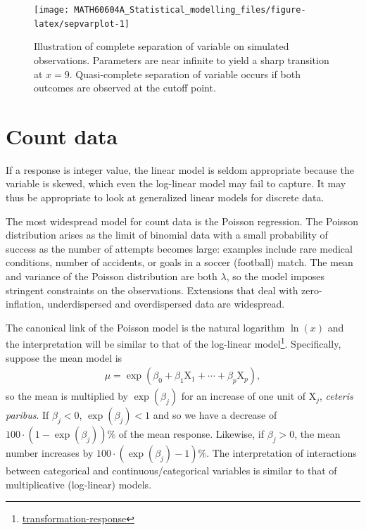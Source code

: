 \documentclass[
  11pt,
  letterpaper,
]{book}
\renewcommand{\href}[2]{#2\footnote{\url{#1}}}
\theoremstyle{definition}
\theoremstyle{definition}
\theoremstyle{definition}
\theoremstyle{definition}
\theoremstyle{remark}
\begin{document}
\begin{figure}

{\centering \texttt{[image: MATH60604A\_Statistical\_modelling\_files/figure-latex/sepvarplot-1]} 

}

\caption{Illustration of complete separation of variable on simulated observations. Parameters are near infinite to yield a sharp transition at $x=9$. Quasi-complete separation of variable occurs if both outcomes are observed at the cutoff point.}\label{fig:sepvarplot}
\end{figure}

\hypertarget{count-data}{%
\section{Count data}\label{count-data}}

If a response is integer value, the linear model is seldom appropriate because the variable is skewed, which even the log-linear model may fail to capture. It may thus be appropriate to look at generalized linear models for discrete data.

The most widespread model for count data is the Poisson regression. The Poisson distribution arises as the limit of binomial data with a small probability of success as the number of attempts becomes large: examples include rare medical conditions, number of accidents, or goals in a soccer (football) match. The mean and variance of the Poisson distribution are both \(\lambda\), so the model imposes stringent constraints on the observations. Extensions that deal with zero-inflation, underdispersed and overdispersed data are widespread.

The canonical link of the Poisson model is the natural logarithm \(\ln(x)\) and the interpretation will be similar to that of the \href{transformation-response}{log-linear model}. Specifically, suppose the
mean model is
\begin{align*}
\mu = \exp(\beta_0 + \beta_1 \mathrm{X}_{1} + \cdots + \beta_p \mathrm{X}_{p}),
\end{align*}
so the mean is multiplied by \(\exp(\beta_j)\) for an increase of one unit of \(\mathrm{X}_{j}\), \emph{ceteris paribus}. If \(\beta_j < 0\), \(\exp(\beta_j) < 1\) and so we have a decrease of \(100\cdot(1-\exp(\beta_j))\)\% of the mean response. Likewise, if \(\beta_j>0\), the mean number increases by \(100\cdot(\exp(\beta_j)-1)\)\%. The interpretation of interactions between categorical and continuous/categorical variables is similar to that of multiplicative (log-linear) models.
\end{document}
